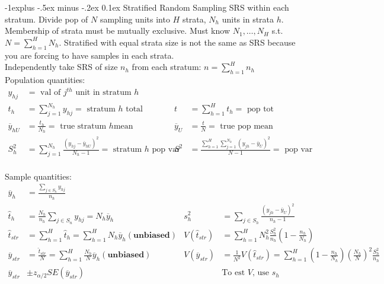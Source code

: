 \documentclass[landscape]{article}
\makeatletter
\renewcommand{\subsection}{\@startsection{subsection}{2}{0mm}%
                                {-1explus -.5ex minus -.2ex}%
                                {0.1ex}%
                                {\color{orange}\normalfont\normalsize\bfseries}}
\makeatother
\begin{document}
\begin{multicols*}{3}
\subsection{Stratified Random Sampling} SRS within each
stratum. Divide pop of $N$ sampling units into $H$ strata, $N_h$ units
in strata $h$. Membership of strata must be mutually exclusive. Must
know $N_1, \ldots, N_H$ s.t. $N = \sum_{h = 1}^H N_h$. Stratified with
equal strata size is not the same as SRS because you are forcing to
have samples in each strata.
\\ Independently take SRS of size $n_h$ from each stratum: $n =
\sum_{h=1}^{H}n_h$
\\ Population quantities:
\begin{align*}
  y_{hj} &= \text{ val of $j^{th}$ unit in stratum $h$}
  \\t_h & =
  \sum_{j=1}^{N_h}y_{hj} = \text{ stratum $h$ total}
  & t  & = \sum_{h=1}^{H}t_h = \text{ pop tot}
  \\ \overline{y}_{hU} & = \frac{t_h}{N_h} =\text{ true stratum $h$
    mean}
  & \overline{y}_U & = \frac{t}{N} =\text{ true pop mean}
  \\S_h^2 & = \sum_{j=1}^{N_h} \frac{(y_{hj} -
    \overline{y}_{hU})^2}{N_h-1} = \text{ stratum $h$ pop var}
  & S^2 & = \frac{\sum_{h=1}^{H}\sum_{j=1}^{N_h}(y_{jh} - \overline{y}_U)^2}{N-1}
= \text{ pop var}
\end{align*}
\\ Sample quantities:
\begin{align*}
\overline{y}_h & = \frac{\sum_{j \in
    S_h}y_{hj}}{n_h}
\\ \hat{t}_h & = \frac{N_h}{n_h} \sum_{j \in S_n}
y_{hj} = N_h \overline{y}_h
 & s_h^2 & = \sum_{j \in S_h} \frac{(y_{jh}
  - \overline{y}_U)^2}{n_h - 1}
\\ \hat{t}_{str} &= \sum_{h=1}^{H}\hat{t}_h = \sum_{h=1}^{H} N_h \overline{y}_h (\textbf{unbiased})
 & V(\hat{t}_{str}) &= \sum_{h=1}^{H} N_h^2
\frac{S_h^2}{n_h} \left(1 - \frac{n_h}{N_h}\right)
\\ \overline{y}_{str} & = \frac{\hat{t}_{str}}{N} = \sum_{h=1}^{H}
\frac{N_h}{N} \overline{y}_h (\textbf{unbiased})
 &V(\overline{y}_{str}) &= \frac{1}{N^2} V(\hat{t}_{str})=\sum_{h = 1}^H \left(1 -
  \frac{n_h}{N_h}\right) \left(\frac{N_h}{N}\right)^2
\frac{S_h^2}{n_h}
\\ \overline{y}_{str}& \pm z_{\alpha/2} SE(\overline{y}_{str}) &  &
                                                                    \text{To
                                                                    est
                                                                    $V$,
                                                                    use
                                                                    $s_h$}
\end{align*}

\end{multicols*}
\end{document}
